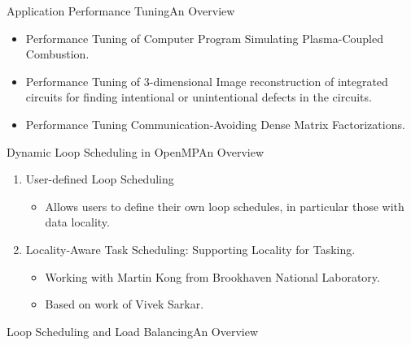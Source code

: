 
\begin{frame}[label=apptuningovw]{Application Performance Tuning}{An Overview}
\begin{itemize}
    \item Performance Tuning of Computer Program Simulating Plasma-Coupled Combustion.
    \item Performance Tuning of 3-dimensional Image reconstruction of integrated circuits for finding intentional or unintentional defects in the circuits.
    \item Performance Tuning Communication-Avoiding Dense Matrix Factorizations. 
\end{itemize}
\end{frame}




\begin{frame}[label=dynworkovw]{Dynamic Loop Scheduling in OpenMP}{An Overview}
\begin{enumerate}
\item User-defined Loop Scheduling
\begin{itemize}
\item Allows users to define their own loop schedules, in particular those with data locality.
\end{itemize}
\item Locality-Aware Task Scheduling: Supporting Locality for Tasking.
\begin{itemize}
\item \small Working with Martin Kong from Brookhaven National Laboratory.
\item \small Based on work of Vivek Sarkar.
\end{itemize}
\end{enumerate}
\end{frame}


 


\begin{frame}[label=lslbovw]{Loop Scheduling and Load Balancing}{An Overview}

\end{frame}

